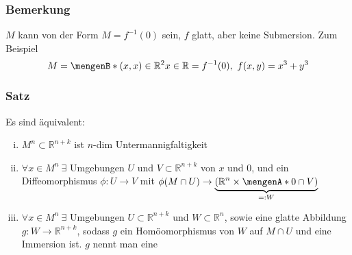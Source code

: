 \subsubsection[Bemerkung: ]{Bemerkung} %
\label{ssub:118}
$M$ kann von der Form $M = f^{-1}(0)$ sein, $f$ glatt, aber keine Submersion. Zum Beispiel
	\[
		M = \set[(x,x)\in \mathds{R}^2]{x \in \mathds{R}} = f^{-1}(0),\ f(x,y) = x^3 +y^3	
	\]
	
\subsubsection[Satz: lokale Parametrisierung von Untermannigfaltigkeiten]{Satz}
\label{ssub:119}
Es sind äquivalent:
\begin{enumerate}[(i)]
	\item $M^n\subset \mathds{R}^{n+k}$ ist $n$-dim Untermannigfaltigkeit
	\item $\forall x \in M^n\ \exists$ Umgebungen $U$ und $V \subset \mathds{R}^{n+k}$ von $x$ und $0$, und ein Diffeomorphismus $\phi: U \to V$ mit $\phi(M\cap U) \to \underbrace{(\mathds{R}^n \times \set{0}\cap V)}_{=: W}$
	\item $\forall x \in M^n\ \exists$ Umgebungen $U\subset \mathds{R}^{n+k}$ und $W\subset \mathds{R}^n$, sowie eine glatte Abbildung $g:W \to \mathds{R}^{n+k}$, sodass $g$ ein Homöomorphismus von $W$ auf $M\cap U$ und eine Immersion ist. $g$ nennt man eine 
\end{enumerate}

